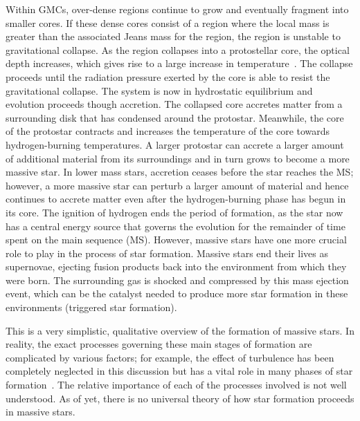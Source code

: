 Within GMCs, over-dense regions continue to grow and eventually fragment into smaller cores.
If these dense cores consist of a region where the local mass is greater than the associated Jeans mass for the region, the region is unstable to gravitational collapse.
As the region collapses into a protostellar core, the optical depth increases, which gives rise to a large increase in temperature~\citep{Zinnecker07}.
The collapse proceeds until the radiation pressure exerted by the core is able to resist the gravitational collapse.
The system is now in hydrostatic equilibrium and evolution proceeds though accretion.
The collapsed core accretes matter from a surrounding disk that has condensed around the protostar.
Meanwhile, the core of the protostar contracts and increases the temperature of the core towards hydrogen-burning temperatures.
A larger protostar can accrete a larger amount of additional material from its surroundings and in turn grows to become a more massive star.
In lower mass stars, accretion ceases before the star reaches the MS; however, a more massive star can perturb a larger amount of material and hence continues to accrete matter even after the hydrogen-burning phase has begun in its core.
The ignition of hydrogen ends the period of formation, as the star now has a central energy source that governs the evolution for the remainder of time spent on the main sequence (MS).
However, massive stars have one more crucial role to play in the process of star formation.
Massive stars end their lives as supernovae, ejecting fusion products back into the environment from which they were born.
The surrounding gas is shocked and compressed by this mass ejection event, which can be the catalyst needed to produce more star formation in these environments (triggered star formation).

This is a very simplistic, qualitative overview of the formation of massive stars.
In reality, the exact processes governing these main stages of formation are complicated by various factors; for example, the effect of turbulence has been completely neglected in this discussion but has a vital role in many phases of star formation~\citep{McKee07}.
The relative importance of each of the processes involved is not well understood.
As of yet, there is no universal theory of how star formation proceeds in massive stars.

